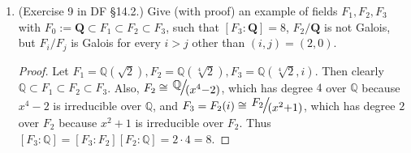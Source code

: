 \documentclass[10pt]{article}
\newcommand{\Q}{\mathbb{Q}}
\DeclareMathOperator*{\Gal}{Gal}
\def\slfrac#1#2{{\mathord{\mathchoice   %
        {\kern.1em\raise.5ex\hbox{$\scriptstyle#1$}\kern-.1em
        /\kern-.15em\lower.25ex\hbox{$\scriptstyle#2$}}
        {\kern.1em\raise.5ex\hbox{$\scriptstyle#1$}\kern-.1em
        /\kern-.15em\lower.25ex\hbox{$\scriptstyle#2$}}
        {\kern.1em\raise.4ex\hbox{$\scriptscriptstyle#1$}\kern-.1em
        /\kern-.14em\lower.25ex\hbox{$\scriptscriptstyle#2$}}
        {\kern.1em\raise.2ex\hbox{$\scriptscriptstyle#1$}\kern-.1em
        /\kern-.1em\lower.25ex\hbox{$\scriptscriptstyle#2$}}}}}
\begin{document}
\begin{enumerate}
\begin{proof}
Thus, $\Gal(K / \Q)$ contains both $\{\zeta_p \mapsto (\zeta_p)^k : 0 \leq k < p-1 \}$ and $\{\sqrt[p]{2} \mapsto (\sqrt[p]{2})^k : 0 \leq k < p \}$.  But the group generated by these two sets has order $p(p-1)$.  It is the group of automorphisms $\sigma_{ij}: K \rightarrow K$ defined by
$$
\zeta_p \mapsto (\zeta_p)^j$$
$$\sqrt[p]{2} \mapsto (\sqrt[p]{2})^k$$
for $0 \leq j < p-1$ and $0 \leq k < p$, since a map of the form $\zeta_p \mapsto (\zeta_p)^j$ fixes any element that one of the form $\sqrt[p]{2} \mapsto (\sqrt[p]{2})^k$ does not, thus their composition must be of the form given above.  So the full Galois group is $\Gal(K/ \Q) = \{ \sigma_{ij} : 0 \leq j < p-1, 0 \leq k < p \}$.

\begin{figure}[h!]
\begin{center}
\end{center}
\end{figure}

\end{proof}

\item (Exercise 9 in DF \S 14.2.) Give (with proof) an example of fields $F_1, F_2, F_3$ with $F_0 := \mathbf{Q} \subset F_1 \subset F_2 \subset F_3$, such that $[F_3:\mathbf{Q}]=8$, $F_2/\mathbf{Q}$ is not Galois, but $F_i/F_j$ is Galois for every $i>j$ other than $(i,j)=(2,0)$.

\begin{proof}

Let $F_1 = \Q(\sqrt{2}), F_2 = \Q(\sqrt[4]{2}), F_3 = \Q(\sqrt[4]{2}, i)$.  Then clearly $\Q \subset F_1 \subset F_2 \subset F_3$.  Also, $F_2 \cong \mathlarger{\mathlarger{\mathlarger{\slfrac{\Q}{(x^4 - 2)}}}}$, which has degree $4$ over $\Q$ because $x^4 - 2$ is irreducible over $\Q$, and $F_3 = F_2(i) \cong \mathlarger{\mathlarger{\mathlarger{\slfrac{F_2}{(x^2 + 1)}}}}$, which has degree $2$ over $F_2$ because $x^2 + 1$ is irreducible over $F_2$.  Thus $[F_3 : \Q] = [F_3 : F_2][F_2 : \Q] = 2 \cdot 4 = 8$.


\end{proof}
\end{enumerate}
\end{document}
